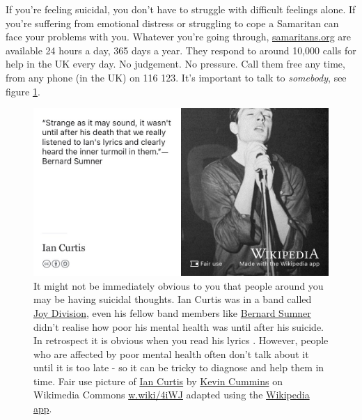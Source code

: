 \documentclass[
]{book}
\begin{document}
If you're feeling suicidal, you don't have to struggle with difficult feelings alone. If you're suffering from emotional distress or struggling to cope a Samaritan can face your problems with you. Whatever you're going through, \href{https://www.samaritans.org/}{samaritans.org} are available 24 hours a day, 365 days a year. They respond to around 10,000 calls for help in the UK every day. No judgement. No pressure. Call them free any time, from any phone (in the UK) on 116 123. It's important to talk to \emph{somebody}, see figure \ref{fig:joydivision-fig}.

\begin{figure}

{\centering \includegraphics[width=0.99\linewidth]{images/ian-curtis-joy-division} 

}

\caption{It might not be immediately obvious to you that people around you may be having suicidal thoughts. Ian Curtis was in a band called \href{https://en.wikipedia.org/wiki/Joy_Division}{Joy Division}, even his fellow band members like \href{https://en.wikipedia.org/wiki/Bernard_Sumner}{Bernard Sumner} didn't realise how poor his mental health was until after his suicide. In retrospect it is obvious when you read his lyrics \citep{isolation}. However, people who are affected by poor mental health often don't talk about it until it is too late - so it can be tricky to diagnose and help them in time. Fair use picture of \href{https://en.wikipedia.org/wiki/Ian_Curtis}{Ian Curtis} by \href{https://en.wikipedia.org/wiki/Kevin_Cummins_(photographer)}{Kevin Cummins} on Wikimedia Commons \href{https://w.wiki/4iWJ}{w.wiki/4iWJ} adapted using the \href{https://apps.apple.com/gb/app/wikipedia/id324715238}{Wikipedia app}.}\label{fig:joydivision-fig}
\end{figure}
\end{document}
